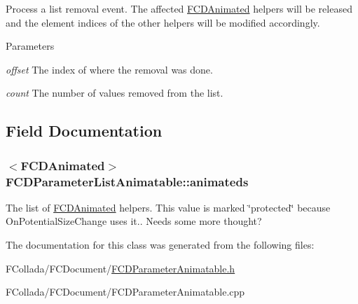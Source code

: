 \label{classFCDParameterListAnimatable_a4d691c5060728861b49b63b64ccff98c}
Process a list removal event. The affected \hyperlink{classFCDAnimated}{FCDAnimated} helpers will be released and the element indices of the other helpers will be modified accordingly. 
\begin{DoxyParams}{Parameters}
\item[{\em offset}]The index of where the removal was done. \item[{\em count}]The number of values removed from the list. \end{DoxyParams}


\subsection{Field Documentation}
\hypertarget{classFCDParameterListAnimatable_a145430d7d71b81045b718a6ec935202a}{
\subsubsection[{animateds}]{$<${\bf FCDAnimated}$>$ {\bf FCDParameterListAnimatable::animateds}}}
\label{classFCDParameterListAnimatable_a145430d7d71b81045b718a6ec935202a}
The list of \hyperlink{classFCDAnimated}{FCDAnimated} helpers. This value is marked \char`\"{}protected\char`\"{} because OnPotentialSizeChange uses it.. Needs some more thought? 

The documentation for this class was generated from the following files:\begin{DoxyCompactItemize}
\item 
FCollada/FCDocument/\hyperlink{FCDParameterAnimatable_8h}{FCDParameterAnimatable.h}\item 
FCollada/FCDocument/FCDParameterAnimatable.cpp\end{DoxyCompactItemize}
